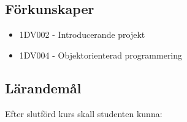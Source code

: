 \subsection*{Förkunskaper}

\begin{itemize}
\tightlist
\item
  1DV002 - Introducerande projekt
\item
  1DV004 - Objektorienterad programmering
\end{itemize}

\subsection*{Lärandemål}

Efter slutförd kurs skall studenten kunna:

